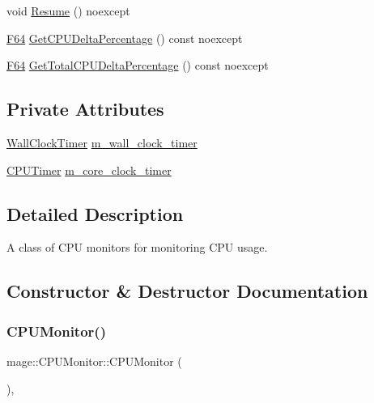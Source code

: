 \begin{DoxyCompactItemize}
\item 
void \mbox{\hyperlink{classmage_1_1_c_p_u_monitor_a5fd594262dc1073da564955c58851760}{Resume}} () noexcept
\item 
\mbox{\hyperlink{namespacemage_ad26233bbec640deda836e572c1a23708}{F64}} \mbox{\hyperlink{classmage_1_1_c_p_u_monitor_a67a4eba9480d15855f6283ec434c215a}{Get\+C\+P\+U\+Delta\+Percentage}} () const noexcept
\item 
\mbox{\hyperlink{namespacemage_ad26233bbec640deda836e572c1a23708}{F64}} \mbox{\hyperlink{classmage_1_1_c_p_u_monitor_aec7712bcef92b93d368c312168ab56bd}{Get\+Total\+C\+P\+U\+Delta\+Percentage}} () const noexcept
\end{DoxyCompactItemize}
\subsection*{Private Attributes}
\begin{DoxyCompactItemize}
\item 
\mbox{\hyperlink{namespacemage_a06f4035ef59f07892e594bf1178a108a}{Wall\+Clock\+Timer}} \mbox{\hyperlink{classmage_1_1_c_p_u_monitor_ac1e3d7a7271515873a7a82a25eca4da2}{m\+\_\+wall\+\_\+clock\+\_\+timer}}
\item 
\mbox{\hyperlink{namespacemage_a1032d81f22079b7190cac3bf14136068}{C\+P\+U\+Timer}} \mbox{\hyperlink{classmage_1_1_c_p_u_monitor_a245b920ef7e6703087b47ad370cb3bbb}{m\+\_\+core\+\_\+clock\+\_\+timer}}
\end{DoxyCompactItemize}


\subsection{Detailed Description}
A class of C\+PU monitors for monitoring C\+PU usage. 

\subsection{Constructor \& Destructor Documentation}
\mbox{\label{classmage_1_1_c_p_u_monitor_ad41542b831ae42cf8dbb206a70535598}} 
\subsubsection{\texorpdfstring{C\+P\+U\+Monitor()}{CPUMonitor()}\hspace{0.1cm}{\footnotesize\ttfamily [1/3]}}
{\footnotesize\ttfamily mage\+::\+C\+P\+U\+Monitor\+::\+C\+P\+U\+Monitor (\begin{DoxyParamCaption}{ }\end{DoxyParamCaption})\hspace{0.3cm}{\ttfamily [default]}, {\ttfamily [noexcept]}}

